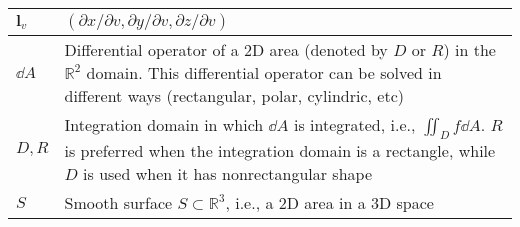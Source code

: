 \begin{xltabular}{\textwidth}{XX}
	\(\mathbf{l}_v\)                                                                                                                                                                                                                                                                                   & \((\partial x/ \partial v, \partial y/ \partial v, \partial z/ \partial v)\)                                                                                                                                                                                                                                                        \\ \hline
	\(\dd{A}\)                                                                                                                                                                                                                                                                                         & Differential operator of a 2D area (denoted by \(D\) or \(R\)) in the \(\mathbb{R}^2\) domain. This differential operator can be solved in different ways (rectangular, polar, cylindric, etc) \cite{stewartCalculus2011}                                                                                                           \\ \hline
	\(D, R\)                                                                                                                                                                                                                                                                                           & Integration domain in which \(\dd{A}\) is integrated, i.e., \(\iint_D f \dd{A}\). \(R\) is preferred when the integration domain is a rectangle, while \(D\) is used when it has nonrectangular shape \cite{stewartCalculus2011}                                                                                                    \\ \hline
	\(S\)                                                                                                                                                                                                                                                                                              & Smooth surface \(S \subset \mathbb{R}^{3}\), i.e., a 2D area in a 3D space                                                                                                                                                                                                                                                          \\ \hline

\end{xltabular}
